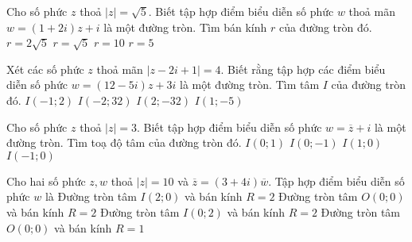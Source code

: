 \begin{ex}%
Cho số phức $z$ thoả $|z|=\sqrt{5}$. Biết tập hợp điểm biểu diễn số phức $w$ thoả mãn $w=(1+2i)z+i$ là một đường tròn. Tìm bán kính $r$ của đường tròn đó.
\choice
{$r=2\sqrt{5}$}
{$r=\sqrt{5}$}
{$r=10$}
{\True$r=5$}

\end{ex}
\begin{ex}%
Xét các số phức $z$ thoả mãn $\left|z-2i+1\right|=4$. Biết rằng tập hợp các điểm biểu diễn số phức $w=(12-5i)z+3i$ là một đường tròn. Tìm tâm $I$ của đường tròn đó.
\choice
{$I(-1;2)$}
{\True$I(-2;32)$}
{$I(2;-32)$}
{$I(1;-5)$}
\end{ex}
\begin{ex}%
Cho số phức $z$ thoả $|z|=3$. Biết tập hợp điểm biểu diễn số phức $w=\overline{z}+i$ là một đường tròn. Tìm toạ độ tâm của đường tròn đó.
\choice
{\True $I(0;1)$}
{$I(0;-1)$}
{$I(1;0)$}
{$I(-1;0)$}
\end{ex}
\begin{ex}%

Cho hai số phức $z, w$ thoả $|z|=10$ và $\overline{z}=(3+4i)\overline{w}$. Tập hợp điểm biểu diễn số phức $w$ là 
\choice
{Đường tròn tâm $I(2;0)$ và bán kính $R=2$}
{\True Đường tròn tâm $O(0;0)$ và bán kính $R=2$}
{Đường tròn tâm $I(0;2)$ và bán kính $R=2$}
{Đường tròn tâm $O(0;0)$ và bán kính $R=1$}
\end{ex}

